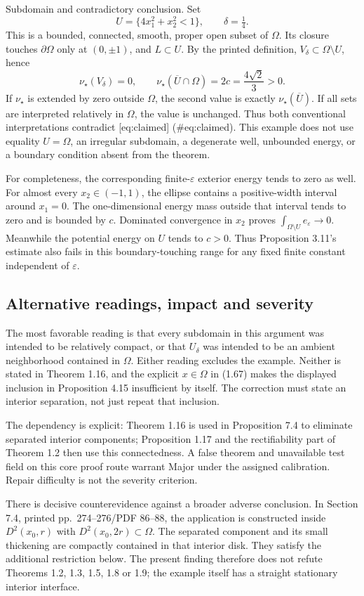 \documentclass[10pt]{article}
\begin{document}
Subdomain and contradictory conclusion. Set \[U=\{4x_1^2+x_2^2<1\},\qquad \delta=\tfrac14.\] This is a bounded, connected, smooth, proper open subset of \(\Omega\). Its closure touches \(\partial\Omega\) only at \((0,\pm1)\), and \(L\subset U\). By the printed definition, \(V_\delta\subset\Omega\setminus U\), hence \[\boxed{\nu_\star(V_\delta)=0,\qquad
        \nu_\star(\overline U\cap\Omega)=2c=\frac{4\sqrt2}{3}>0.}\] If \(\nu_\star\) is extended by zero outside \(\Omega\), the second value is exactly \(\nu_\star(\overline U)\). If all sets are interpreted relatively in \(\Omega\), the value is unchanged. Thus both conventional interpretations contradict [eq:claimed] (\#eq:claimed). This example does not use equality \(U=\Omega\), an irregular subdomain, a degenerate well, unbounded energy, or a boundary condition absent from the theorem.\par
For completeness, the corresponding finite-\(\varepsilon\) exterior energy tends to zero as well. For almost every \(x_2\in(-1,1)\), the ellipse contains a positive-width interval around \(x_1=0\). The one-dimensional energy mass outside that interval tends to zero and is bounded by \(c\). Dominated convergence in \(x_2\) proves \(\int_{\Omega\setminus U}e_\varepsilon\to0\). Meanwhile the potential energy on \(U\) tends to \(c>0\). Thus Proposition 3.11’s estimate also fails in this boundary-touching range for any fixed finite constant independent of \(\varepsilon\).\par
\subsection*{Alternative readings, impact and severity}
The most favorable reading is that every subdomain in this argument was intended to be relatively compact, or that \(U_\delta\) was intended to be an ambient neighborhood contained in \(\Omega\). Either reading excludes the example. Neither is stated in Theorem 1.16, and the explicit \(x\in\Omega\) in (1.67) makes the displayed inclusion in Proposition 4.15 insufficient by itself. The correction must state an interior separation, not just repeat that inclusion.\par
The dependency is explicit: Theorem 1.16 is used in Proposition 7.4 to eliminate separated interior components; Proposition 1.17 and the rectifiability part of Theorem 1.2 then use this connectedness. A false theorem and unavailable test field on this core proof route warrant Major under the assigned calibration. Repair difficulty is not the severity criterion.\par
There is decisive counterevidence against a broader adverse conclusion. In Section 7.4, printed pp. 274–276/PDF 86–88, the application is constructed inside \(D^2(x_0,r)\) with \(D^2(x_0,2r)\subset\Omega\). The separated component and its small thickening are compactly contained in that interior disk. They satisfy the additional restriction below. The present finding therefore does not refute Theorems 1.2, 1.3, 1.5, 1.8 or 1.9; the example itself has a straight stationary interior interface.\par
\end{document}
